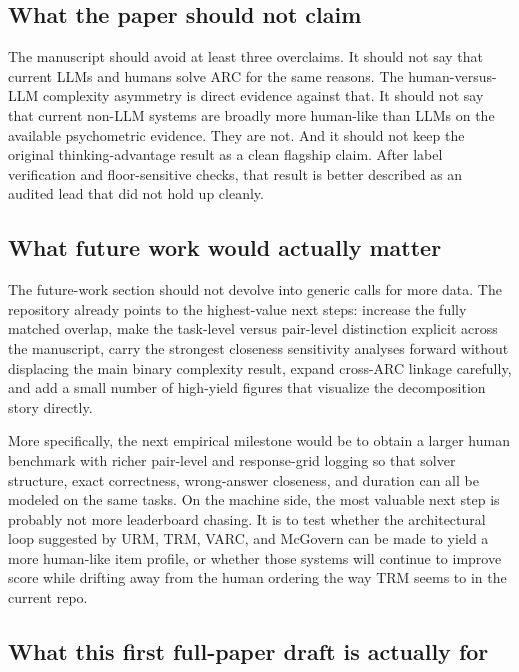 \documentclass[11pt,letterpaper]{article}
\begin{document}
\subsection{What the paper should not claim}

The manuscript should avoid at least three overclaims. It should not say that current LLMs and humans solve ARC for the same reasons. The human-versus-LLM complexity asymmetry is direct evidence against that. It should not say that current non-LLM systems are broadly more human-like than LLMs on the available psychometric evidence. They are not. And it should not keep the original thinking-advantage result as a clean flagship claim. After label verification and floor-sensitive checks, that result is better described as an audited lead that did not hold up cleanly.

\subsection{What future work would actually matter}

The future-work section should not devolve into generic calls for more data. The repository already points to the highest-value next steps: increase the fully matched overlap, make the task-level versus pair-level distinction explicit across the manuscript, carry the strongest closeness sensitivity analyses forward without displacing the main binary complexity result, expand cross-ARC linkage carefully, and add a small number of high-yield figures that visualize the decomposition story directly.

More specifically, the next empirical milestone would be to obtain a larger human benchmark with richer pair-level and response-grid logging so that solver structure, exact correctness, wrong-answer closeness, and duration can all be modeled on the same tasks. On the machine side, the most valuable next step is probably not more leaderboard chasing. It is to test whether the architectural loop suggested by URM, TRM, VARC, and McGovern can be made to yield a more human-like item profile, or whether those systems will continue to improve score while drifting away from the human ordering the way TRM seems to in the current repo.

\subsection{What this first full-paper draft is actually for}
\end{document}
